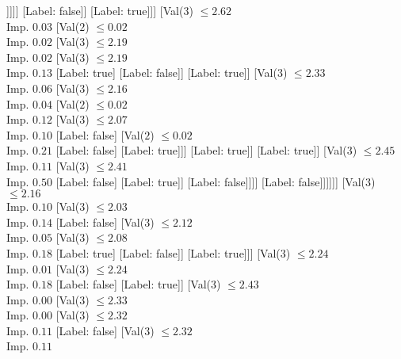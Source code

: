 \documentclass[margin=10pt]{standalone}
\begin{document}
\begin{forest}
																			]]]]
															[Label: false]]
														[Label: true]]]
												[Val($3$) $ \leq 2.62$ \\ Imp. $0.03$
													[Val($2$) $ \leq 0.02$ \\ Imp. $0.02$
														[Val($3$) $ \leq 2.19$ \\ Imp. $0.02$
															[Val($3$) $ \leq 2.19$ \\ Imp. $0.13$
																[Label: true]
																[Label: false]]
															[Label: true]]
														[Val($3$) $ \leq 2.33$ \\ Imp. $0.06$
															[Val($3$) $ \leq 2.16$ \\ Imp. $0.04$
																[Val($2$) $ \leq 0.02$ \\ Imp. $0.12$
																	[Val($3$) $ \leq 2.07$ \\ Imp. $0.10$
																		[Label: false]
																		[Val($2$) $ \leq 0.02$ \\ Imp. $0.21$
																			[Label: false]
																			[Label: true]]]
																	[Label: true]]
																[Label: true]]
															[Val($3$) $ \leq 2.45$ \\ Imp. $0.11$
																[Val($3$) $ \leq 2.41$ \\ Imp. $0.50$
																	[Label: false]
																	[Label: true]]
																[Label: false]]]]
													[Label: false]]]]]]
								[Val($3$) $ \leq 2.16$ \\ Imp. $0.10$
									[Val($3$) $ \leq 2.03$ \\ Imp. $0.14$
										[Label: false]
										[Val($3$) $ \leq 2.12$ \\ Imp. $0.05$
											[Val($3$) $ \leq 2.08$ \\ Imp. $0.18$
												[Label: true]
												[Label: false]]
											[Label: true]]]
									[Val($3$) $ \leq 2.24$ \\ Imp. $0.01$
										[Val($3$) $ \leq 2.24$ \\ Imp. $0.18$
											[Label: false]
											[Label: true]]
										[Val($3$) $ \leq 2.43$ \\ Imp. $0.00$
											[Val($3$) $ \leq 2.33$ \\ Imp. $0.00$
												[Val($3$) $ \leq 2.32$ \\ Imp. $0.11$
													[Label: false]
													[Val($3$) $ \leq 2.32$ \\ Imp. $0.11$

\end{forest}
\end{document}
